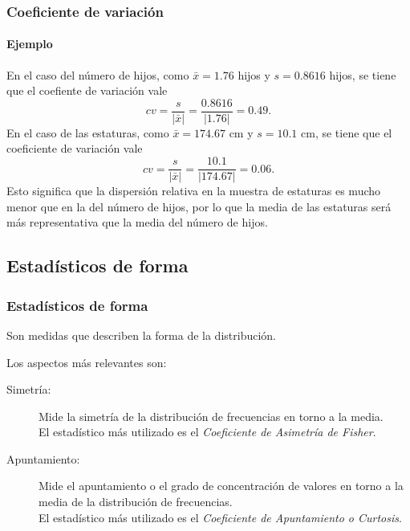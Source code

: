 \begin{frame}
\frametitle{Coeficiente de variación}
\framesubtitle{Ejemplo}
En el caso del número de hijos, como $\bar x=1.76$ hijos y $s=0.8616$ hijos, se tiene que el coefiente de variación vale
\[
cv = \frac{s}{|\bar x|} = \frac{0.8616}{|1.76|} = 0.49.
\]
En el caso de las estaturas, como $\bar x=174.67$ cm y $s=10.1$ cm, se tiene que el coeficiente de variación vale
\[
cv = \frac{s}{|\bar x|} = \frac{10.1}{|174.67|} = 0.06.
\]
Esto significa que la dispersión relativa en la muestra de estaturas es mucho menor que en la del número de hijos, por
lo que la media de las estaturas será más representativa que la media del número de hijos. 
\end{frame}


\subsection{Estadísticos de forma}
\begin{frame}
\frametitle{Estadísticos de forma}
Son medidas que describen la forma de la distribución.

Los aspectos más relevantes son:
\begin{description}
\item[Simetría:] Mide la simetría de la distribución de frecuencias en torno a la media.\\
El estadístico más utilizado es el \emph{Coeficiente de Asimetría de Fisher}.
\item[Apuntamiento:] Mide el apuntamiento o el grado de concentración de valores en torno a la media de la distribución de frecuencias.\\
El estadístico más utilizado es el \emph{Coeficiente de Apuntamiento o Curtosis}.
\end{description}
\end{frame}


